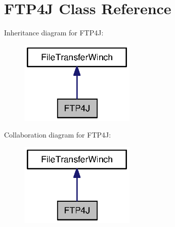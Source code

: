\section{F\+T\+P4\+J Class Reference}
\label{classorg_1_1smallfoot_1_1filexfer_1_1FTP4J}


Inheritance diagram for F\+T\+P4\+J\+:\nopagebreak
\begin{figure}[H]
\begin{center}
\leavevmode
\includegraphics[width=156pt]{classorg_1_1smallfoot_1_1filexfer_1_1FTP4J__inherit__graph}
\end{center}
\end{figure}


Collaboration diagram for F\+T\+P4\+J\+:\nopagebreak
\begin{figure}[H]
\begin{center}
\leavevmode
\includegraphics[width=156pt]{classorg_1_1smallfoot_1_1filexfer_1_1FTP4J__coll__graph}
\end{center}
\end{figure}
